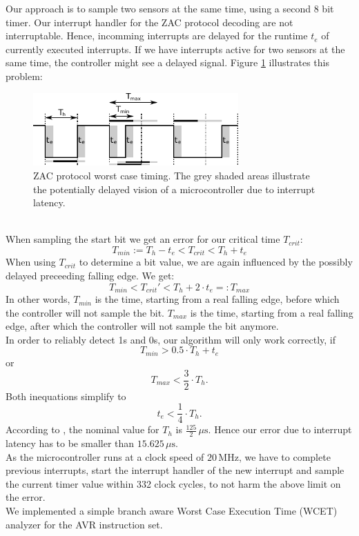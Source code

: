 \documentclass[a4paper]{scrreprt}
\begin{document}
Our approach is to sample two sensors at the
same time, using a second 8 bit timer. Our interrupt handler for the ZAC protocol decoding are not interruptable.
Hence, incomming interrupts are delayed for the runtime $t_e$ of currently executed interrupts.
If we have interrupts active for two sensors at the same time, the controller might see a delayed signal.
Figure \ref{fig:zactiming} illustrates this problem:
\begin{figure}[Hh!]
	\centering
	\includegraphics[width=0.7\textwidth]{img/zac_timing.pdf}
	\caption{ZAC protocol worst case timing. The grey shaded areas illustrate the potentially delayed vision
	of a microcontroller due to interrupt latency.}
	\label{fig:zactiming}
\end{figure}
\\
When sampling the start bit we get an error for our critical time $T_{crit}$:
$$T_{min} := T_h - t_e < T_{crit} < T_h + t_e$$
When using $T_{crit}$ to determine a bit value, we are again influenced by the possibly delayed preceeding falling edge. We get:
$$T_{min} < T_{crit}' < T_h + 2 \cdot t_e =: T_{max}$$
In other words, $T_{min}$ is the time, starting from a real falling edge,
before which the controller will not sample the bit. $T_{max}$ is the time,
starting from a real falling edge, after which the controller will not sample
the bit anymore.\\
In order to reliably detect 1s and 0s, our algorithm will only work correctly, if
$$T_{min} > 0.5\cdot T_h + t_e$$
or
$$T_{max} < \frac{3}{2}\cdot T_h\text{.}$$
Both inequations simplify to
$$t_e < \frac{1}{4}\cdot T_h\text{.}$$
According to \cite{zac}, the nominal value for $T_h$ is $\frac{125}{2}\,\mu\mathrm{s}$. Hence our error due to
interrupt latency has to be smaller than $15.625\,\mu\mathrm{s}$.\\
As the microcontroller runs at a clock speed of $20\,\mathrm{MHz}$, we have to complete previous interrupts,
start the interrupt handler of the new interrupt and sample the current timer value within 332 clock cycles,
to not harm the above limit on the error.\\
We implemented a simple branch aware Worst Case Execution Time (WCET) analyzer for the AVR instruction set.
\end{document}
